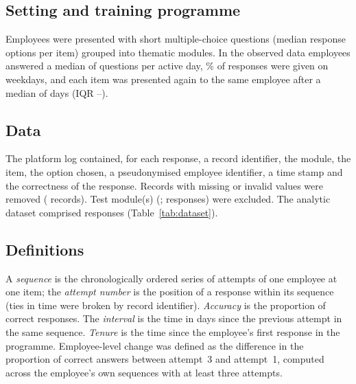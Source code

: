 \subsection{Setting and training programme}
Employees were presented with short multiple-choice questions (median \OptionsMedian{} response
options per item) grouped into thematic modules. In the observed data employees answered a median of
\DailyMedian{} questions per active day, \WeekdayPct\% of responses were given on weekdays, and each
item was presented again to the same employee after a median of \GapMedian{} days
(IQR \GapQOne--\GapQThree).

\subsection{Data}
The platform log contained, for each response, a record identifier, the module, the item, the option
chosen, a pseudonymised employee identifier, a time stamp and the correctness of the response.
Records with missing or invalid values were removed (\NRejected{} records). Test module(s)
(\ExcludedModules; \NExcluded{} responses) were excluded. The analytic dataset comprised
\NResponses{} responses (Table~\ref{tab:dataset}). 

\subsection{Definitions}
A \emph{sequence} is the chronologically ordered series of attempts of one employee at one item;
the \emph{attempt number} is the position of a response within its sequence (ties in time were
broken by record identifier). \emph{Accuracy} is the proportion of correct responses. The
\emph{interval} is the time in days since the previous attempt in the same sequence. \emph{Tenure} is
the time since the employee's first response in the programme. Employee-level change was defined as
the difference in the proportion of correct answers between attempt~3 and attempt~1, computed across
the employee's own sequences with at least three attempts.


